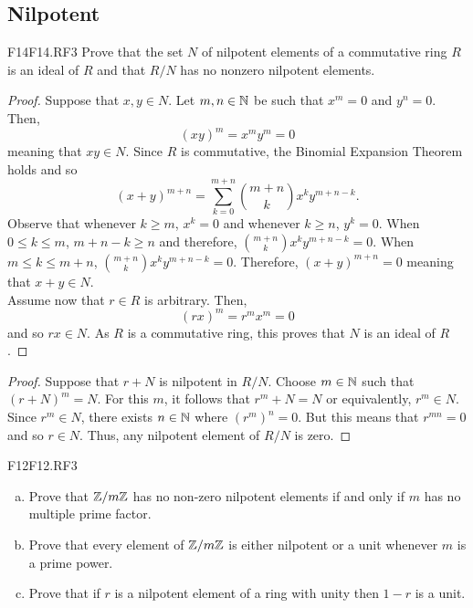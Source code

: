 \documentclass[../AlgebraQualSolutions.tex]{subfiles}
\begin{document}
\subsection{Nilpotent}

\begin{prob}{F14}{F14.RF3}
	Prove that the set $N$ of nilpotent elements of a commutative ring $R$ is an ideal of $R$ and that $R/N$ has no nonzero nilpotent elements.
\end{prob}

\begin{proof}
	Suppose that $x,y \in N$. Let $m,n \in \mathbb{N}$ be such that $x^m = 0$ and $y^n = 0$. Then,
		\[(xy)^m = x^my^m = 0 \]
	meaning that $xy \in N$. Since $R$ is commutative, the Binomial Expansion Theorem holds and so
		\[(x + y)^{m+n} = \sum_{k=0}^{m+n} {{m+n}\choose{k}}x^ky^{m+n - k}.\]
	Observe that whenever $k \geq m$, $x^k = 0$ and whenever $k \geq n$, $y^k = 0$. When $0 \leq k \leq m$, $m + n - k \geq n$ and therefore, ${{m+n}\choose{k}}x^ky^{m+n - k} = 0$. When $m \leq k \leq m+n$, ${{m+n}\choose{k}}x^ky^{m+n - k} = 0$. Therefore, $(x+y)^{m+n} = 0$ meaning that $x + y \in N$.\\

	Assume now that $r \in R$ is arbitrary. Then,
		\[(rx)^m = r^mx^m = 0\]
	and so $rx \in N$. As $R$ is a commutative ring, this proves that $N$ is an ideal of $R$.
\end{proof}

\begin{proof}
	Suppose that $r + N$ is nilpotent in $R/N$. Choose $m \in \mathbb{N}$ such that $(r + N)^m = N$. For this $m$, it follows that $r^m + N = N$ or equivalently, $r^m \in N$. Since $r^m \in N$, there exists $n \in \mathbb{N}$ where $(r^m)^n = 0$. But this means that $r^{mn} = 0$ and so $r \in N$. Thus, any nilpotent element of $R/N$ is zero.
\end{proof}

\begin{prob}{F12}{F12.RF3}
\begin{enumerate}[(a)]
\item Prove that $\mathbb{Z}/m\mathbb{Z}$ has no non-zero nilpotent elements if and only if $m$ has no multiple prime factor.
\item Prove that every element of $\mathbb{Z}/m\mathbb{Z}$ is either nilpotent or a unit whenever $m$ is a prime power.
\item Prove that if $r$ is a nilpotent element of a ring with unity then $1-r$ is a unit.
\end{enumerate}
\end{prob}
\end{document}
